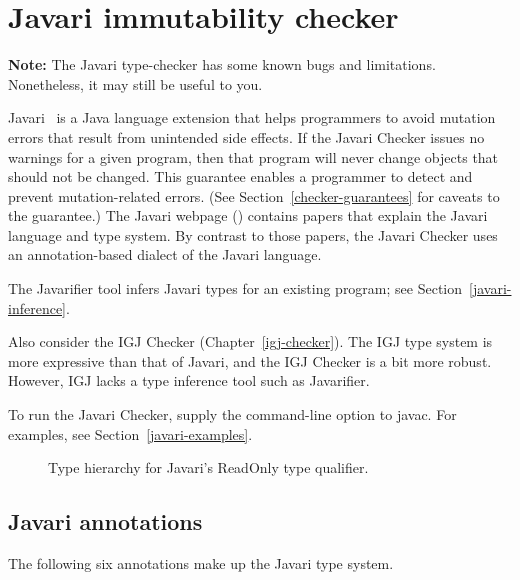 \htmlhr
\chapter{Javari immutability checker\label{javari-checker}}

\textbf{Note:} The Javari type-checker has some known bugs and limitations.
Nonetheless, it may still be useful to you.

Javari~\cite{TschantzE2005,QuinonezTE2008} is a Java language extension that helps programmers to avoid mutation
errors that result from unintended side effects.
If the Javari Checker issues no warnings for a given program, then that
program will never change objects that should not be changed.  This
guarantee enables a programmer to detect and prevent mutation-related
errors.  (See Section~\ref{checker-guarantees} for caveats to the guarantee.)
The Javari webpage () contains
papers that explain the Javari language and type system.
By contrast to those papers, the Javari Checker uses an annotation-based
dialect of the Javari language.

The Javarifier tool infers Javari types for an existing program; see
Section~\ref{javari-inference}.

Also consider the IGJ Checker (Chapter~\ref{igj-checker}).  The IGJ type
system is more expressive than that of Javari, and the IGJ Checker is a bit
more robust.  However, IGJ lacks a type inference tool such as Javarifier.

To run the Javari Checker, supply the
command-line option to javac.  For examples, see Section~\ref{javari-examples}.



\begin{figure}
\caption{Type hierarchy for Javari's ReadOnly type qualifier.}
\label{fig-javari-hierarchy}
\end{figure}


\section{Javari annotations\label{javari-annotations}}

The following six annotations make up the Javari type system.

